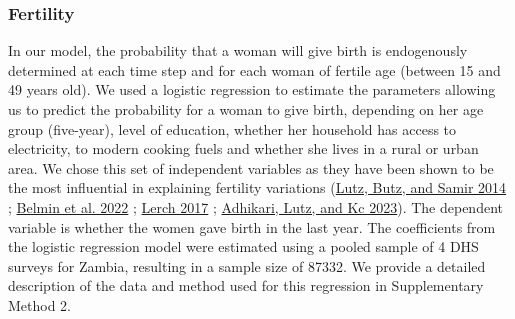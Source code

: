 \documentclass[
]{article}
\begin{document}
\hypertarget{fertility}{%
\subsubsection{Fertility}\label{fertility}}

In our model, the probability that a woman will give birth is endogenously determined at each time step and for each woman of fertile age (between 15 and 49 years old). We used a logistic regression to estimate the parameters allowing us to predict the probability for a woman to give birth, depending on her age group (five-year), level of education, whether her household has access to electricity, to modern cooking fuels and whether she lives in a rural or urban area. We chose this set of independent variables as they have been shown to be the most influential in explaining fertility variations (\protect\hyperlink{ref-lutz_world_2014}{Lutz, Butz, and Samir 2014} ; \protect\hyperlink{ref-belmin_fertility_2022}{Belmin et al. 2022} ; \protect\hyperlink{ref-lerch_urban_2017}{Lerch 2017} ; \protect\hyperlink{ref-adhikari_ruralurban_2023}{Adhikari, Lutz, and Kc 2023}). The dependent variable is whether the women gave birth in the last year. The coefficients from the logistic regression model were estimated using a pooled sample of 4 DHS surveys for Zambia, resulting in a sample size of 87332. We provide a detailed description of the data and method used for this regression in Supplementary Method 2.
\end{document}
